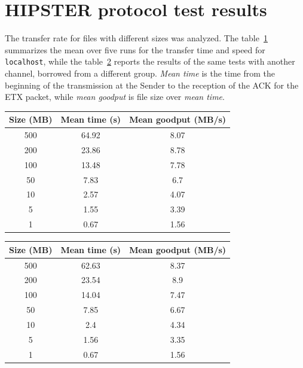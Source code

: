 \documentclass[10pt,twocolumn]{article}
\begin{document}
\section{HIPSTER protocol test results}
The transfer rate for files with different sizes was analyzed. The
table~\ref{table:ourChannel} summarizes the mean over five runs for the transfer time and speed for
\texttt{localhost}, while the table~\ref{table:anotherChannel} reports the
results of the same tests with another channel, borrowed from a different group. \textit{Mean time} is the time from the beginning of the transmission at the Sender to the reception of the ACK for the ETX packet, while \textit{mean goodput} is file size over \textit{mean time}.
\begin{table}[h]
\centering
\begin{tabular}{|c|c|c|}
	Size (MB) & Mean time (s) & Mean goodput (MB/s)\\ \hline
  500       & 64.92    & 8.07  \\
  200       & 23.86    & 8.78  \\
	100       & 13.48    & 7.78  \\
	50        & 7.83     & 6.7 \\
	10        & 2.57     & 4.07 \\
	5         & 1.55     & 3.39  \\
	1         & 0.67     & 1.56  \\
\end{tabular}
\label{table:ourChannel}
\end{table}

\begin{table}[h]
\centering
\begin{tabular}{|c|c|c|}
  Size (MB) & Mean time (s) & Mean goodput (MB/s)\\ \hline
  500       & 62.63    & 8.37  \\
  200       & 23.54    & 8.9  \\
  100       & 14.04    & 7.47  \\
  50        & 7.85     & 6.67 \\
  10        & 2.4      & 4.34 \\
  5         & 1.56     & 3.35 \\
  1         & 0.67     & 1.56 \\

\end{tabular}
\label{table:anotherChannel}
\end{table}
\end{document}
